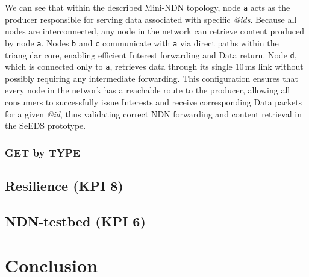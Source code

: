 \documentclass{article}
\begin{document}
We can see that within the described Mini-NDN topology, node \texttt{a} acts as the producer responsible for serving data associated with specific \textit{@ids}. Because all nodes are interconnected, any node in the network can retrieve content produced by node \texttt{a}. Nodes \texttt{b} and \texttt{c} communicate with \texttt{a} via direct paths within the triangular core, enabling efficient Interest forwarding and Data return. Node \texttt{d}, which is connected only to \texttt{a}, retrieves data through its single 10\,ms link without possibly requiring any intermediate forwarding. This configuration ensures that every node in the network has a reachable route to the producer, allowing all consumers to successfully issue Interests and receive corresponding Data packets for a given \textit{@id}, thus validating correct NDN forwarding and content retrieval in the SeEDS prototype.


\subsubsection{GET by TYPE}

\subsection{Resilience (KPI 8)}
\subsection{NDN-testbed (KPI 6)}
\section{Conclusion}
\end{document}
